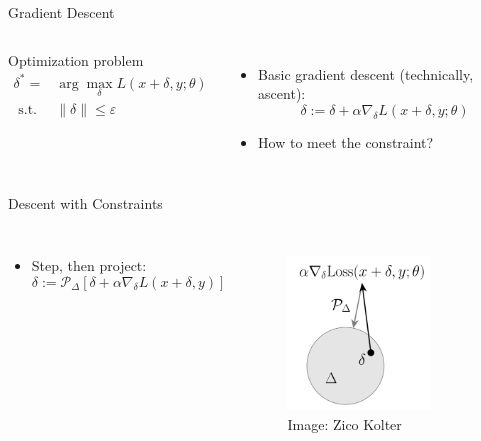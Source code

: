\documentclass[10pt]{beamer}
\begin{document}
\begin{frame}{Gradient Descent}
  \begin{columns}[T,onlytextwidth]

    \begin{alertblock}{Optimization problem}
      \[
        \begin{aligned}
          \delta^* =& \arg \max_{\delta} L(x + \delta, y; \theta) \\
          \text{ s.t. } & \parallel \delta \parallel \leq \varepsilon
        \end{aligned}
      \]
    \end{alertblock}

    \begin{itemize}[<+-| alert@+>]
      \item Basic gradient descent (technically, ascent): \[
          \delta := \delta + \alpha \nabla_\delta L(x + \delta, y; \theta)
      \]
      \item How to meet the constraint?
    \end{itemize}

      

  \end{columns}

\end{frame}


\begin{frame}{Descent with Constraints}
  \begin{columns}[T,onlytextwidth]

    \begin{itemize}[<+-| @alert+>]
      \item Step, then project: \[
        \delta := \mathcal{P}_\Delta
          [ \delta + \alpha \nabla_\delta L(x + \delta, y)]
      \]
    \end{itemize}


      \begin{figure}
      \centering
      \includegraphics[width=1.5in]{projected_l2.png}
      \\
      {\footnotesize Image: Zico Kolter}
      \end{figure}

  \end{columns}

\end{frame}
\end{document}
